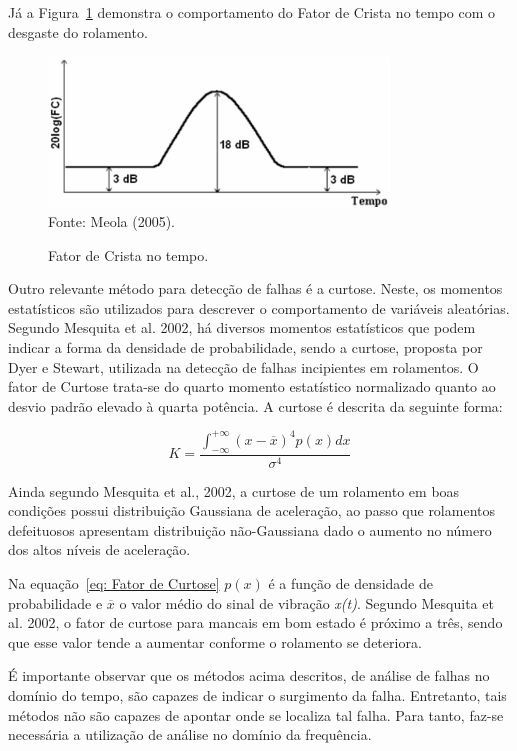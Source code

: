\documentclass[
	12pt,				
	oneside,			
	a4paper,			
	english,			
	brazil,			
	]{abntex2ppgsi}
\begin{document}
Já a Figura~\ref{FatorCrista} demonstra o comportamento do Fator de Crista no tempo com o desgaste do rolamento.

\begin{figure}[!htb]
\centering
\caption {Fator de Crista no tempo.}
\includegraphics[width=\textwidth,height=40mm,keepaspectratio]{Figura19} \\
Fonte: Meola (2005).
\label{FatorCrista}
\end{figure}	

Outro relevante método para detecção de falhas é a curtose. Neste, os momentos estatísticos são utilizados para descrever o comportamento de variáveis aleatórias. Segundo Mesquita et al. 2002, há diversos momentos estatísticos que podem indicar a forma da densidade de probabilidade, sendo a curtose, proposta por Dyer e Stewart, utilizada na detecção de falhas incipientes em rolamentos. O fator de Curtose trata-se do quarto momento estatístico normalizado quanto ao desvio padrão elevado à quarta potência. A curtose é descrita da seguinte forma:

\begin{equation}
	K = \frac{ \int_{-\infty}^{+\infty} (x - \overline{x})^{4}p(x)dx } {\sigma^{4}}
	\label{eq: Fator de Curtose}
\end{equation}

Ainda segundo Mesquita et al., 2002, a curtose de um rolamento em boas condições possui distribuição Gaussiana de aceleração, ao passo que rolamentos defeituosos apresentam distribuição não-Gaussiana dado o aumento no número dos altos níveis de aceleração. 

Na equação~\ref{eq: Fator de Curtose} $p(x)$ é a função de densidade de probabilidade e $\overline{x}$ o valor médio do sinal de vibração \textit{x(t)}. Segundo Mesquita et al. 2002, o fator de curtose para mancais em bom estado é próximo a três, sendo que esse valor tende a aumentar conforme o rolamento se deteriora. 

É importante observar que os métodos acima descritos, de análise de falhas no domínio do tempo, são capazes de indicar o surgimento da falha. Entretanto, tais métodos não são capazes de apontar onde se localiza tal falha. Para tanto, faz-se necessária a utilização de análise no domínio da frequência. 
\end{document}
